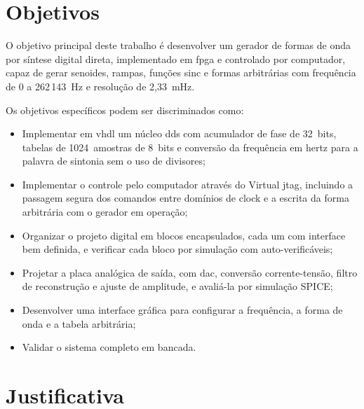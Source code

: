 \section{Objetivos}

O objetivo principal deste trabalho é desenvolver um gerador de formas de onda por síntese digital direta, implementado em \ac{fpga} e controlado por computador, capaz de gerar senoides, rampas, funções sinc e formas arbitrárias com frequência de 0 a 262\,143~Hz e resolução de 2,33~mHz.

Os objetivos específicos podem ser discriminados como:
\begin{itemize}
	\item Implementar em \ac{vhdl} um núcleo \ac{dds} com acumulador de fase de 32~bits, tabelas de 1024~amostras de 8~bits e conversão da frequência em hertz para a palavra de sintonia sem o uso de divisores;
	\item Implementar o controle pelo computador através do Virtual \ac{jtag}, incluindo a passagem segura dos comandos entre domínios de clock e a escrita da forma arbitrária com o gerador em operação;
	\item Organizar o projeto digital em blocos encapsulados, cada um com interface bem definida, e verificar cada bloco por simulação com  auto-verificáveis;
	\item Projetar a placa analógica de saída, com \ac{dac}, conversão corrente-tensão, filtro de reconstrução e ajuste de amplitude, e avaliá-la por simulação SPICE;
	\item Desenvolver uma interface gráfica para configurar a frequência, a forma de onda e a tabela arbitrária;
	\item Validar o sistema completo em bancada.
\end{itemize}

\section{Justificativa}

